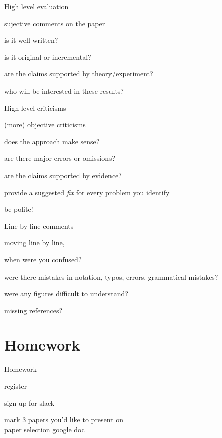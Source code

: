 \documentclass[presentation,xcolor={usenames,dvipsnames}]{beamer}
\begin{document}
\begin{frame}{High level evaluation}

sujective comments on the paper
\bit
\item is it well written?
\item is it original or incremental?
\item are the claims supported by theory/experiment?
\item who will be interested in these results?
\eit

\end{frame}

\begin{frame}{High level criticisms}

(more) objective criticisms
\bit
\item does the approach make sense?
\item are there major errors or omissions?
\item are the claims supported by evidence?
\item provide a suggested \emph{fix} for every problem you identify
\item be polite!
\eit

\end{frame}

\begin{frame}{Line by line comments}

moving line by line,
\bit
\item when were you confused?
\item were there mistakes in notation, typos, errors, grammatical mistakes?
\item were any figures difficult to understand?
\item missing references?
\eit

\end{frame}

\section{Homework}

\begin{frame}{Homework}

\bit
\item register
\item sign up for slack
\item mark 3 papers you'd like to present on \\
\href{https://docs.google.com/spreadsheets/d/1eSJn0_ANEXfOsZZrYwHoQ6F00FKBLz4olbKVtOLoE40}{paper selection google doc}
\eit

\end{frame}
\end{document}
